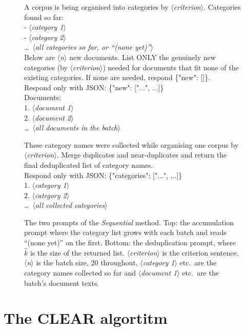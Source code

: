 \documentclass[11pt,a4paper,oneside]{report}
\newcommand{\ph}[1]{\textcolor{blue!60!black}{\rmfamily\itshape $\langle$#1$\rangle$}}
\begin{document}
\begin{figure}[htbp]
\begin{promptbox}
\small\ttfamily
A corpus is being organised into categories by \ph{criterion}. Categories found so far:\\
- \ph{category 1}\\
- \ph{category 2}\\
\ldots\ \ph{all categories so far, or ``(none yet)''}\\[4pt]
Below are \ph{n} new documents. List ONLY the genuinely new categories (by \ph{criterion}) needed for documents that fit none of the existing categories. If none are needed, respond \{"new": []\}.\\
Respond only with JSON: \{"new": ["...", ...]\}\\[4pt]
Documents:\\
1. \ph{document 1}\\
2. \ph{document 2}\\
\ldots\ \ph{all documents in the batch}
\end{promptbox}
\begin{promptbox}
\small\ttfamily
These category names were collected while organising one corpus by \ph{criterion}. Merge duplicates and near-duplicates and return the final deduplicated list of category names.\\
Respond only with JSON: \{"categories": ["...", ...]\}\\[4pt]
1. \ph{category 1}\\
2. \ph{category 2}\\
\ldots\ \ph{all collected categories}
\end{promptbox}
\caption[Sequential accumulation prompts]{The two prompts of the \textit{Sequential} method. Top: the accumulation prompt where the category list grows with each batch and reads ``(none yet)'' on the first. Bottom: the deduplication prompt, where $\hat{k}$ is the size of the returned list. \ph{criterion} is the criterion sentence, \ph{n} is the batch size, 20 throughout, \ph{category 1} etc.\ are the category names collected so far and \ph{document 1} etc.\ are the batch's document texts.}
\label{fig:prompt-sequential}
\end{figure}

\FloatBarrier

\section{The CLEAR algortitm}\label{app:prompts-critclust}
\end{document}
